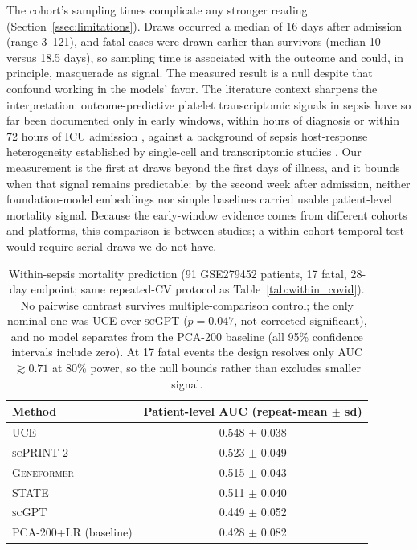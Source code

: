 \documentclass[11pt,a4paper]{article}
\newcommand{\model}[1]{\textsc{#1}}
\begin{document}
The cohort's sampling times complicate any stronger reading
(Section~\ref{ssec:limitations}). Draws occurred a median of 16 days after
admission (range 3--121), and fatal cases were drawn earlier than survivors
(median 10 versus 18.5 days), so sampling time is associated with the outcome
and could, in principle, masquerade as signal. The measured result is a null
despite that confound working in the models' favor. The literature context
sharpens the interpretation: outcome-predictive platelet transcriptomic signals
in sepsis have so far been documented only in early windows, within hours of
diagnosis or within 72 hours of ICU admission
\citep{qiu2021sepsis, middleton2019sepsis, middleton2020nets}, against a
background of sepsis host-response heterogeneity established by single-cell
and transcriptomic studies \citep{reyes2020immune, davenport2016genomic,
sweeney2018unsupervised}. Our measurement is the first at
draws beyond the first days of illness, and it bounds when that signal remains
predictable: by the second week after admission, neither foundation-model
embeddings nor simple baselines carried usable patient-level mortality signal.
Because the early-window evidence comes from different cohorts and platforms,
this comparison is between studies; a within-cohort temporal test would
require serial draws we do not have.

\begin{table}[t]
\centering
\caption{Within-sepsis mortality prediction (91 GSE279452 patients, 17 fatal,
28-day endpoint; same repeated-CV protocol as
Table~\ref{tab:within_covid}). No pairwise contrast survives
multiple-comparison control; the only nominal one was \model{UCE} over
\model{scGPT} ($p = 0.047$, not corrected-significant), and no model
separates from the PCA-200 baseline (all 95\% confidence intervals include
zero). At 17 fatal events the design resolves only AUC $\gtrsim 0.71$ at
80\% power, so the null bounds rather than excludes smaller signal.}
\label{tab:within_sepsis}
\small
\begin{tabular}{lc}
\toprule
\textbf{Method} & \textbf{Patient-level AUC (repeat-mean $\pm$ sd)} \\
\midrule
\model{UCE} & 0.548 $\pm$ 0.038 \\
\model{scPRINT-2} & 0.523 $\pm$ 0.049 \\
\model{Geneformer} & 0.515 $\pm$ 0.043 \\
\model{STATE} & 0.511 $\pm$ 0.040 \\
\model{scGPT} & 0.449 $\pm$ 0.052 \\
PCA-200+LR (baseline) & 0.428 $\pm$ 0.082 \\
\bottomrule
\end{tabular}
\end{table}
\end{document}
